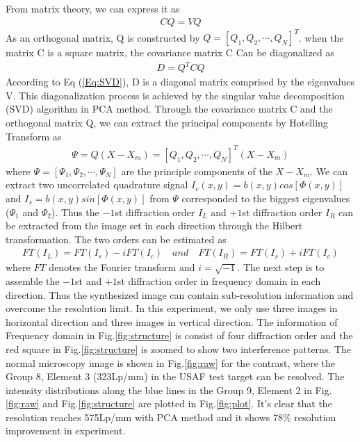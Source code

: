 \documentclass[letterpaper,10pt]{article}
\begin{document}
From matrix theory, we can express it as
\begin{eqnarray}
CQ = VQ \label{Eq:eig}
\end{eqnarray}
As an orthogonal matrix, Q is constructed by $Q=[Q_1,Q_2,\cdots,Q_N]^T$.
when the matrix C is a square matrix, the covariance matrix C Can be diagonalized as
\begin{eqnarray}
D = Q^TCQ \label{Eq:SVD}
\end{eqnarray}
According to Eq (\ref{Eq:SVD}), D is a diagonal matrix comprised by the eigenvalues V.
This diagonalization process is achieved by the singular value decomposition (SVD) algorithm in PCA method.
Through the covariance matrix C and the orthogonal matrix Q, we can extract the principal components by Hotelling Transform as
\begin{eqnarray}
\Psi = Q(X-X_m) = [Q_1,Q_2,\cdots,Q_N]^T(X-X_m) \label{Eq:Hotelling}
\end{eqnarray}
where $\Psi=[\Psi_1,\Psi_2,\cdots,\Psi_N]$ are the principle components of the $X-X_m$.
We can extract two uncorrelated quadrature signal $I_c(x,y) = b(x,y)cos[\Phi(x,y)]$ and $I_s = b(x,y)sin[\Phi(x,y)]$ from $\Psi$ corresponded to the biggest eigenvalues ($\Psi_1$ and $\Psi_2$).
Thus the $-1$st diffraction order $I_L$ and $+1$st diffraction order $I_R$ can be extracted from the image set in each direction through the Hilbert transformation.
The two orders can be estimated as
\begin{eqnarray}
FT(I_L) = FT(I_s) - iFT(I_c) \quad and \quad FT(I_R) = FT(I_s) + iFT(I_c) \label{Eq:Hilbert}
\end{eqnarray}
where $FT$ denotes the Fourier transform and $i = \sqrt{-1}$.
The next step is to assemble the $-1$st and $+1$st diffraction order in frequency domain in each direction.
Thus the synthesized image can contain sub-resolution information and overcome the resolution limit.
In this experiment, we only use three images in horizontal direction and three images in vertical direction.
The information of Frequency domain in Fig.\ref{fig:structure} is consist of four diffraction order and the red square in Fig.\ref{fig:structure} is zoomed to show two interference patterns.
The normal microscopy image is shown in Fig.\ref{fig:raw} for the contrast, where the Group 8, Element 3 (323Lp/mm) in the USAF test target can be resolved.
The intensity distributions along the blue lines in the Group 9, Element 2 in Fig.\ref{fig:raw} and Fig.\ref{fig:structure} are plotted in Fig.\ref{fig:plot}.
It's clear that the resolution reaches 575Lp/mm with PCA method and it shows $78\%$ resolution improvement in experiment.
\end{document}
